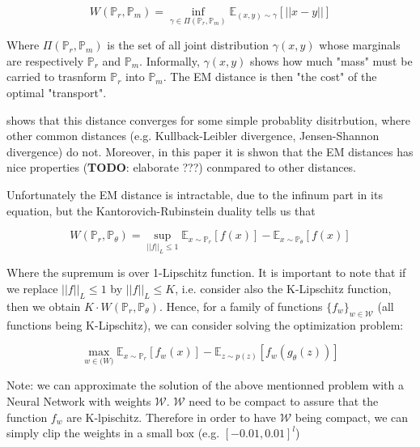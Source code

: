 \documentclass{article}
\begin{document}
\begin{equation}
    W(\mathbb{P}_r, \mathbb{P}_m) = \inf_{\gamma \in \Pi(\mathbb{P}_r, \mathbb{P}_m)} \mathbb{E}_{(x,y) \sim \gamma} [||x-y||]
\end{equation}

Where $\Pi(\mathbb{P}_r, \mathbb{P}_m)$ is the set of all joint distribution $\gamma(x,y)$ whose marginals are respectively $\mathbb{P}_r$ and $\mathbb{P}_m$. Informally, $\gamma(x,y)$ shows how much "mass" must be carried to trasnform $\mathbb{P}_r$ into $\mathbb{P}_m$. The EM distance is then "the cost" of the optimal "transport".

\cite{arjovsky2017wasserstein} shows that this distance converges for some simple probablity disitrbution, where other common distances (e.g. Kullback-Leibler divergence, Jensen-Shannon divergence) do not. Moreover, in this paper it is shwon that the EM distances has nice properties (\textbf{TODO}: elaborate ???) conmpared to other distances. 

Unfortunately the EM distance is intractable, due to the infinum part in its equation, but the Kantorovich-Rubinstein duality tells us that

\begin{equation}
    W(\mathbb{P}_r, \mathbb{P}_{\theta}) = \sup_{||f||_L \leq 1} \mathbb{E}_{x \sim \mathbb{P}_r} [f(x)] - \mathbb{E}_{x \sim \mathbb{P}_{\theta}} [f(x)] 
\end{equation}

Where the supremum is over 1-Lipschitz function. It is important to note that if we replace $||f||_L \leq 1$ by $||f||_L \leq K$, i.e. consider also the K-Lipschitz function, then we obtain $K \cdot W(\mathbb{P}_r, \mathbb{P}_{\theta})$. Hence, for a family of functions $\{f_w\}_{w \in \mathcal{W}}$ (all functions being K-Lipschitz), we can consider solving the optimization problem:

\begin{equation}
    \max_{w \in \mathcal(W)}  \mathbb{E}_{x \sim \mathbb{P}_r}[f_w(x)] - \mathbb{E}_{z \sim p(z)}[f_w(g_{\theta}(z))]
\end{equation}

Note: we can approximate the solution of the above mentionned problem with a Neural Network with weights $\mathcal{W}$. $\mathcal{W}$ need to be compact to assure that the function $f_w$ are K-lpischitz. Therefore in order to have $\mathcal{W}$ being compact, we can simply clip the weights in a small box (e.g. $[-0.01, 0.01]^l$)    
\end{document}
